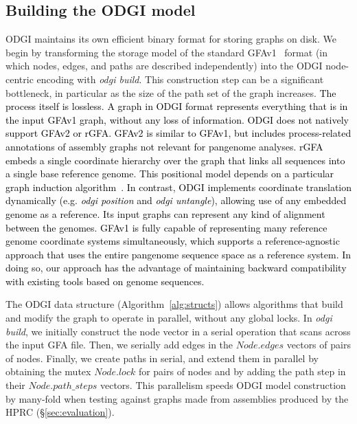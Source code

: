 \documentclass{bioinfo}
\newcommand{\REVIEWED}[1]{{\textcolor{Black}{#1}}}
\begin{document}



\subsection{Building the \textsc{ODGI} model}
\label{sec:build}
ODGI maintains its own efficient binary format for storing graphs on disk.
We begin by transforming the storage model of the standard GFAv1~\citep{GFA} format (in which nodes, edges, and paths are described independently) into the ODGI node-centric encoding with \textit{odgi build}.
This construction step can be a significant bottleneck, in particular as the size of the path set of the graph increases. \REVIEWED{The process itself is lossless. A graph in ODGI format represents everything that is in the input GFAv1 graph, without any loss of information.} \REVIEWED{ODGI does not natively support GFAv2 or rGFA.
GFAv2 is similar to GFAv1, but includes process-related annotations of assembly graphs not relevant for pangenome analyses.
rGFA embeds a single coordinate hierarchy over the graph that links all sequences into a single base reference genome.
This positional model depends on a particular graph induction algorithm~\cite{Li:2020}.
In contrast, ODGI implements coordinate translation dynamically (e.g. \textit{odgi position} and \textit{odgi untangle}), allowing use of any embedded genome as a reference.
Its input graphs can represent any kind of alignment between the genomes.
GFAv1 is fully capable of representing many reference genome coordinate systems simultaneously, which supports a reference-agnostic approach that uses the entire pangenome sequence space as a reference system.
In doing so, our approach has the advantage of maintaining backward compatibility with existing tools based on genome sequences.
}

The ODGI data structure (Algorithm~\ref{alg:structs}) allows algorithms that build and modify the graph to operate in parallel, without any global locks.
In \textit{odgi build}, we initially construct the node vector in a serial operation that scans across the input GFA file.
Then, we serially add edges in the $Node.edges$ vectors of pairs of nodes.
Finally, we create paths in serial, and extend them in parallel by obtaining the mutex $Node.lock$ for pairs of nodes and by adding the path step in their $Node.path\_steps$ vectors.
This parallelism speeds ODGI model construction by many-fold when testing against graphs made from assemblies produced by the HPRC (\S\ref{sec:evaluation}).
\end{document}

